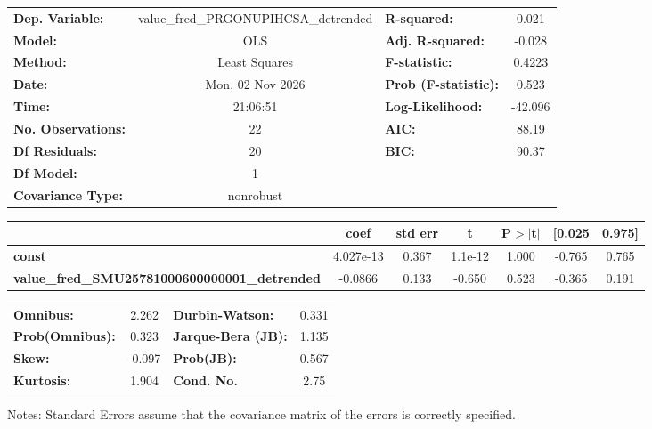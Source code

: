 \begin{center}
\begin{tabular}{lclc}
\toprule
\textbf{Dep. Variable:}                               & value\_fred\_PRGONUPIHCSA\_detrended & \textbf{  R-squared:         } &     0.021   \\
\textbf{Model:}                                       &                 OLS                  & \textbf{  Adj. R-squared:    } &    -0.028   \\
\textbf{Method:}                                      &            Least Squares             & \textbf{  F-statistic:       } &    0.4223   \\
\textbf{Date:}                                        &           Mon, 02 Nov 2026           & \textbf{  Prob (F-statistic):} &    0.523    \\
\textbf{Time:}                                        &               21:06:51               & \textbf{  Log-Likelihood:    } &   -42.096   \\
\textbf{No. Observations:}                            &                    22                & \textbf{  AIC:               } &     88.19   \\
\textbf{Df Residuals:}                                &                    20                & \textbf{  BIC:               } &     90.37   \\
\textbf{Df Model:}                                    &                     1                & \textbf{                     } &             \\
\textbf{Covariance Type:}                             &              nonrobust               & \textbf{                     } &             \\
\bottomrule
\end{tabular}
\begin{tabular}{lcccccc}
                                                      & \textbf{coef} & \textbf{std err} & \textbf{t} & \textbf{P$> |$t$|$} & \textbf{[0.025} & \textbf{0.975]}  \\
\midrule
\textbf{const}                                        &    4.027e-13  &        0.367     &   1.1e-12  &         1.000        &       -0.765    &        0.765     \\
\textbf{value\_fred\_SMU25781000600000001\_detrended} &      -0.0866  &        0.133     &    -0.650  &         0.523        &       -0.365    &        0.191     \\
\bottomrule
\end{tabular}
\begin{tabular}{lclc}
\textbf{Omnibus:}       &  2.262 & \textbf{  Durbin-Watson:     } &    0.331  \\
\textbf{Prob(Omnibus):} &  0.323 & \textbf{  Jarque-Bera (JB):  } &    1.135  \\
\textbf{Skew:}          & -0.097 & \textbf{  Prob(JB):          } &    0.567  \\
\textbf{Kurtosis:}      &  1.904 & \textbf{  Cond. No.          } &     2.75  \\
\bottomrule
\end{tabular}
\end{center}

Notes: \newline
 [1] Standard Errors assume that the covariance matrix of the errors is correctly specified.